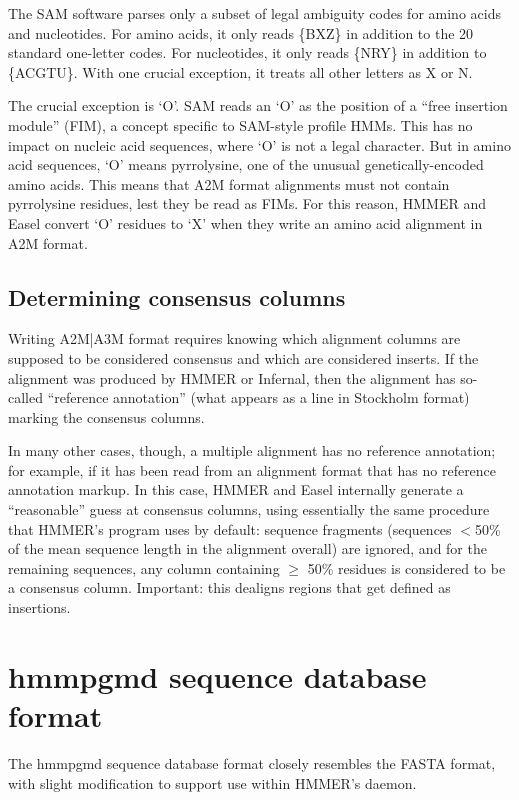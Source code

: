 The SAM software parses only a subset of legal ambiguity codes for
amino acids and nucleotides. For amino acids, it only reads \{BXZ\} in
addition to the 20 standard one-letter codes. For nucleotides, it only
reads \{NRY\} in addition to \{ACGTU\}. With one crucial exception, it
treats all other letters as X or N. 

The crucial exception is `O'. SAM reads an `O' as the position of a
``free insertion module'' (FIM), a concept specific to SAM-style
profile HMMs. This has no impact on nucleic acid sequences, where `O'
is not a legal character. But in amino acid sequences, `O' means
pyrrolysine, one of the unusual genetically-encoded amino acids.  This
means that A2M format alignments must not contain pyrrolysine
residues, lest they be read as FIMs. For this reason, HMMER and Easel convert
`O' residues to `X' when they write an amino acid alignment in A2M
format.

\subsection{Determining consensus columns}

Writing A2M|A3M format requires knowing which alignment columns are
supposed to be considered consensus and which are considered
inserts. If the alignment was produced by HMMER or Infernal, then the
alignment has so-called ``reference annotation'' (what appears as a
 line in Stockholm format) marking the consensus
columns. 

In many other cases, though, a multiple alignment has no reference
annotation; for example, if it has been read from an alignment format
that has no reference annotation markup.  In this case, HMMER and
Easel internally generate a ``reasonable'' guess at consensus columns,
using essentially the same procedure that HMMER's 
program uses by default: sequence fragments (sequences $<$50\% of the
mean sequence length in the alignment overall) are ignored, and for
the remaining sequences, any column containing $\geq$ 50\% residues is
considered to be a consensus column.  Important: this dealigns regions
that get defined as insertions.


\newpage
\section{hmmpgmd sequence database format}

The hmmpgmd sequence database format closely resembles the 
FASTA format, with slight modification to support use within HMMER's
 daemon. 


